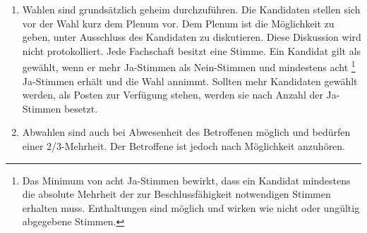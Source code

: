 \begin{enumerate}
\item{Wahlen sind grundsätzlich geheim durchzuführen. Die Kandidaten stellen sich vor der Wahl kurz
dem Plenum vor. Dem Plenum ist die Möglichkeit zu geben, unter Ausschluss des Kandidaten zu
diskutieren. Diese Diskussion wird nicht protokolliert. Jede Fachschaft besitzt eine Stimme. Ein Kandidat gilt als gewählt,
wenn er mehr Ja-Stimmen als Nein-Stimmen und mindestens acht \footnote{Das Minimum von acht Ja-Stimmen bewirkt, dass ein Kandidat mindestens
die absolute Mehrheit der zur Beschlussfähigkeit notwendigen Stimmen erhalten
muss. Enthaltungen sind möglich und wirken wie nicht oder ungültig abgegebene Stimmen.}  Ja-Stimmen erhält und die Wahl
annimmt. Sollten mehr Kandidaten gewählt werden, als Posten zur
Verfügung stehen, werden sie nach Anzahl der Ja-Stimmen besetzt.}

\item{Abwahlen sind auch bei Abwesenheit des Betroffenen möglich und bedürfen einer 2/3-Mehrheit.
Der Betroffene ist jedoch nach Möglichkeit anzuhören.}
\end{enumerate}



